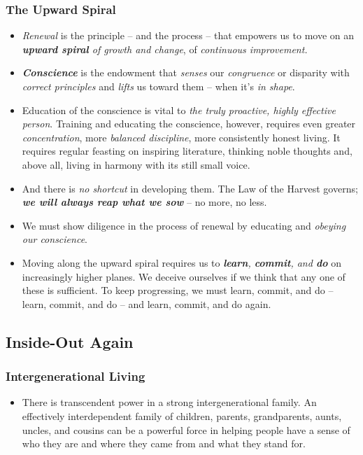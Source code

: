 \documentclass[11pt]{article}
\begin{document}
\subsubsection{The Upward Spiral}
\begin{itemize}
\item \emph{Renewal} is the principle -- and the process -- that empowers us to move on an \emph{\textbf{upward spiral} of growth and change}, of \emph{continuous improvement.}

\item \emph{\textbf{Conscience}} is the endowment that \emph{senses} our \emph{congruence} or disparity with \emph{correct principles} and \emph{lifts} us toward them -- when it's \emph{in shape}.

\item Education of the conscience is vital to \emph{the truly proactive, highly effective person}. Training and educating the conscience, however, requires even greater \emph{concentration}, more \emph{balanced discipline}, more consistently honest living. It requires regular feasting on inspiring literature, thinking noble thoughts and, above all, living in harmony with its still small voice.

\item And there is \emph{no shortcut} in developing them. The Law of the Harvest governs; \emph{\textbf{we will always reap what we sow}} -- no more, no less. 

\item We must show diligence in the process of renewal by educating and \emph{obeying our conscience}. 

\item Moving along the upward spiral requires us to \emph{\textbf{learn}, \textbf{commit}, and \textbf{do}} on increasingly higher planes. We deceive ourselves if we think that any one of these is sufficient. To keep progressing, we must learn, commit, and do -- learn, commit, and do -- and learn, commit, and do again.
\end{itemize}
\subsection{Inside-Out Again}
\subsubsection{Intergenerational Living}
\begin{itemize}
\item There is transcendent power in a strong intergenerational family. An effectively interdependent family of children, parents, grandparents, aunts, uncles, and cousins can be a powerful force in helping people have a sense of who they are and where they came from and what they stand for.
\end{itemize}
\end{document}
